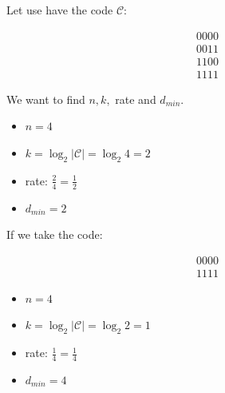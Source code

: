 
    Let use have the code $\mathcal{C}$:
    \begin{minipage}{0.5\textwidth}
    \begin{align*} 0000\\0011\\1100\\1111 \end{align*}
    \end{minipage}
    \begin{minipage}{0.5\textwidth}
    We want to find $n, k, $ rate and $d_{min}$.
    \begin{itemize}
        \item $n = 4$
        \item $k = \log_2 \left|\mathcal{C}\right| = \log_2 4 = 2$
        \item rate: $\frac{2}{4} = \frac{1}{2}$
        \item $d_{min} = 2$
    \end{itemize}
\end{minipage} 

    If we take the code:
    \begin{minipage}{0.5\textwidth}
    \begin{align*} 0000\\ 1111 \end{align*}
    \end{minipage}
    \begin{minipage}{0.5\textwidth}
    \begin{itemize}
        \item $n = 4$
        \item $k = \log_2 \left|\mathcal{C}\right| = \log_2 2 = 1$
        \item rate: $\frac{1}{4} = \frac{1}{4}$
        \item $d_{min} = 4$
    \end{itemize}
\end{minipage} 
 
